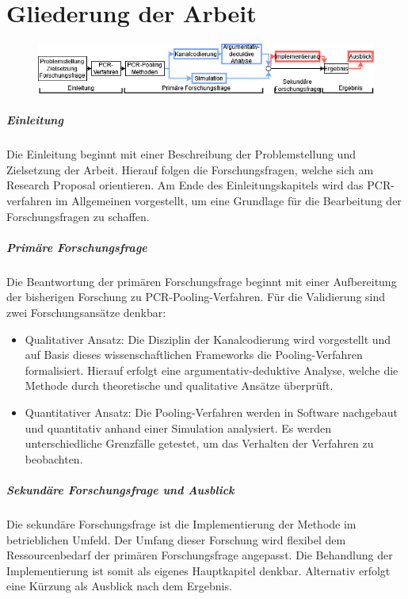 
\chapter{Gliederung der Arbeit}
\begin{figure}[h]
	\centering
	\includegraphics[height=.15\textwidth]{images/Untitled Diagram.drawio}
\end{figure}

\paragraph{Einleitung}
Die Einleitung beginnt mit einer Beschreibung der Problemstellung und Zielsetzung der Arbeit.
Hierauf folgen die Forschungsfragen, welche sich am Research Proposal orientieren.
Am Ende des Einleitungskapitels wird das PCR-verfahren im Allgemeinen vorgestellt, um eine Grundlage für die Bearbeitung der Forschungsfragen zu schaffen.

\paragraph{Primäre Forschungsfrage}
Die Beantwortung der primären Forschungsfrage beginnt mit einer Aufbereitung der bisherigen Forschung zu PCR-Pooling-Verfahren.
Für die Validierung sind zwei Forschungsansätze denkbar:
\begin{itemize}
	\setlength{\itemsep}{-8pt}
	\item Qualitativer Ansatz:
				Die Disziplin der Kanalcodierung wird vorgestellt und auf Basis dieses wissenschaftlichen Frameworks die Pooling-Verfahren formalisiert.
				Hierauf erfolgt eine argumentativ-deduktive Analyse, welche die Methode durch theoretische und qualitative Ansätze überprüft.
	\item Quantitativer Ansatz:
				Die Pooling-Verfahren werden in Software nachgebaut und quantitativ anhand einer Simulation analysiert.
				Es werden unterschiedliche Grenzfälle getestet, um das Verhalten der Verfahren zu beobachten.
\end{itemize}

\paragraph{Sekundäre Forschungsfrage und Ausblick}
Die sekundäre Forschungsfrage ist die Implementierung der Methode im betrieblichen Umfeld.
Der Umfang dieser Forschung wird flexibel dem Ressourcenbedarf der primären Forschungsfrage angepasst.
Die Behandlung der Implementierung ist somit als eigenes Hauptkapitel denkbar.
Alternativ erfolgt eine Kürzung als Ausblick nach dem Ergebnis.

